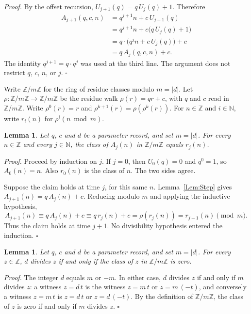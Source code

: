 \documentclass[11pt,letterpaper]{article}
\newcommand{\N}{\mathbb{N}}
\newcommand{\Z}{\mathbb{Z}}
\newtheorem{lemma}[theorem]{Lemma}
\newenvironment{proof}{\noindent\textit{Proof.}}{\hfill\(\square\)}
\begin{document}
\begin{proof}
By the offset recursion, \(U_{j+1}(q)=q\,U_{j}(q)+1\). Therefore
\begin{align*}
A_{j+1}(q,c,n)
&= q^{j+1}n+c\,U_{j+1}(q)\\
&= q^{j+1}n+c\bigl(q\,U_{j}(q)+1\bigr)\\
&= q\cdot\bigl(q^{j}n+c\,U_{j}(q)\bigr)+c\\
&= q\,A_{j}(q,c,n)+c.
\end{align*}
The identity \(q^{j+1}=q\cdot q^{j}\) was used at the third line. The argument does not restrict \(q\), \(c\), \(n\), or \(j\).
\end{proof}

Write \(\Z/m\Z\) for the ring of residue classes modulo \(m=|d|\). Let \(\rho\colon\Z/m\Z\to\Z/m\Z\) be the residue walk \(\rho(r)=qr+c\), with \(q\) and \(c\) read in \(\Z/m\Z\). Write \(\rho^{0}(r)=r\) and \(\rho^{k+1}(r)=\rho(\rho^{k}(r))\). For \(n\in\Z\) and \(i\in\N\), write \(r_{i}(n)\) for \(\rho^{i}(n\bmod m)\).

\begin{lemma}
\label{Lem:Cast}
Let \(q\), \(c\) and \(d\) be a parameter record, and set \(m=|d|\). For every \(n\in\Z\) and every \(j\in\N\), the class of \(A_{j}(n)\) in \(\Z/m\Z\) equals \(r_{j}(n)\).
\end{lemma}

\begin{proof}
Proceed by induction on \(j\). If \(j=0\), then \(U_{0}(q)=0\) and \(q^{0}=1\), so \(A_{0}(n)=n\). Also \(r_{0}(n)\) is the class of \(n\). The two sides agree.

Suppose the claim holds at time \(j\), for this same \(n\). Lemma~\ref{Lem:Step} gives \(A_{j+1}(n)=q\,A_{j}(n)+c\). Reducing modulo \(m\) and applying the inductive hypothesis,
\[
A_{j+1}(n)\equiv q\,A_{j}(n)+c\equiv q\,r_{j}(n)+c=\rho(r_{j}(n))=r_{j+1}(n)
\pmod{m}.
\]
Thus the claim holds at time \(j+1\). No divisibility hypothesis entered the induction.
\end{proof}

\begin{lemma}
\label{Lem:Zero}
Let \(q\), \(c\) and \(d\) be a parameter record, and set \(m=|d|\). For every \(z\in\Z\), \(d\) divides \(z\) if and only if the class of \(z\) in \(\Z/m\Z\) is zero.
\end{lemma}

\begin{proof}
The integer \(d\) equals \(m\) or \(-m\). In either case, \(d\) divides \(z\) if and only if \(m\) divides \(z\): a witness \(z=d\,t\) is the witness \(z=m\,t\) or \(z=m\,(-t)\), and conversely a witness \(z=m\,t\) is \(z=d\,t\) or \(z=d\,(-t)\). By the definition of \(\Z/m\Z\), the class of \(z\) is zero if and only if \(m\) divides \(z\).
\end{proof}
\end{document}
